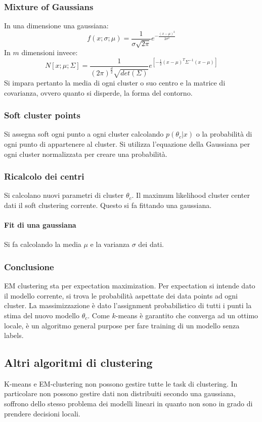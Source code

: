 		\subsubsection{Mixture of Gaussians}
		In una dimensione una gaussiana:
		$$f(x;\sigma;\mu) = \frac{1}{\sigma\sqrt{2\pi}}e^{-\frac{(x-\mu)^2}{2\sigma^2}}$$
		In $m$ dimensioni invece:
		$$N[x;\mu;\Sigma] = \frac{1}{(2\pi)^{\frac{d}{2}}\sqrt{det(\Sigma)}}e^{[-\frac{1}{2}(x-\mu)^T\Sigma^{-1}(x-\mu)]}$$
		Si impara pertanto la media di ogni cluster o suo centro e la matrice di covarianza, ovvero quanto si disperde, la forma del contorno.
		
		\subsubsection{Soft cluster points}
		Si assegna soft ogni punto a ogni cluster calcolando $p(\theta_c|x)$ o la probabilit\`a di ogni punto di appartenere al cluster.
		Si utilizza l'equazione della Gaussiana per ogni cluster normalizzata per creare una probabilit\`a.
		
		\subsubsection{Ricalcolo dei centri}
		Si calcolano nuovi parametri di cluster $\theta_c$.
		Il maximum likelihood cluster center dati il soft clustering corrente.
		Questo si fa fittando una gaussiana.
		
		\paragraph{Fit di una gaussiana}
		Si fa calcolando la media $\mu$ e la varianza $\sigma$ dei dati.
		
		\subsubsection{Conclusione}
		EM clustering sta per expectation maximization.
		Per expectation si intende dato il modello corrente, si trova le probabilit\`a aspettate dei data points ad ogni cluster.
		La massimizzazione \`e dato l'assignment probabilistico di tutti i punti la stima del nuovo modello $\theta_c$.
		Come $k$-means \`e garantito che converga ad un ottimo locale, \`e un algoritmo general purpose per fare training di un modello senza labels.

	\subsection{Altri algoritmi di clustering}
	K-means e EM-clustering non possono gestire tutte le task di clustering.
	In particolare non possono gestire dati non distribuiti secondo una gaussiana, soffrono dello stesso problema dei modelli lineari in quanto non sono in grado di prendere decisioni locali.

